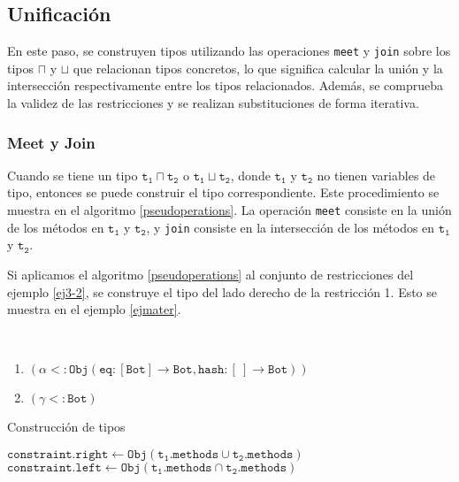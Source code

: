 \subsection{Unificación}
En este paso, se construyen tipos utilizando las operaciones \texttt{meet} y \texttt{join} sobre los tipos $\sqcap$ y $\sqcup$ que relacionan tipos concretos, lo que significa calcular la unión y la intersección respectivamente entre los tipos relacionados. Además, se comprueba la validez de las restricciones y se realizan substituciones de forma iterativa.

\subsubsection{Meet y Join}
Cuando se tiene un tipo $\mathtt{t_1 \sqcap t_2}$ o $\mathtt{t_1 \sqcup t_2}$, donde $\mathtt{t_1}$ y $\mathtt{t_2}$ no tienen variables de tipo, entonces se puede construir el tipo correspondiente. Este procedimiento se muestra en el algoritmo \ref{pseudoperations}. La operación \texttt{meet} consiste en la unión de los métodos en $\mathtt{t_1}$ y $\mathtt{t_2}$, y \texttt{join} consiste en la intersección de los métodos en $\mathtt{t_1}$ y $\mathtt{t_2}$.

Si aplicamos el algoritmo \ref{pseudoperations} al conjunto de restricciones del ejemplo \ref{ej3-2}, se construye el tipo del lado derecho de la restricción 1. Esto se muestra en el ejemplo \ref{ejmater}.
\clearpage
\begin{ej}\
  \normalfont
  \label{ejmater}
  \begin{enumerate}
    \item $\mathtt{(\alpha <: Obj(eq : [Bot] \rightarrow Bot, hash : [\ ] \rightarrow Bot))}$
    \item $\mathtt{(\gamma <: Bot)}$
  \end{enumerate}
\end{ej}


\begin{algorithm}\captionsetup{labelsep=newline}
  \centering
  \caption{Construcción de tipos}
  \label{pseudoperations}
    \begin{algorithmic}[1]
                \State $\mathtt{constraint.right\gets Obj(t_1.methods \cup t_2.methods)}$
              \EndCase
            \EndSwitch
                \State $\mathtt{constraint.left\gets Obj(t_1.methods \cap t_2.methods)}$
              \EndCase
            \EndSwitch
          \EndFor
      \EndFunction
    \end{algorithmic}
\end{algorithm}

